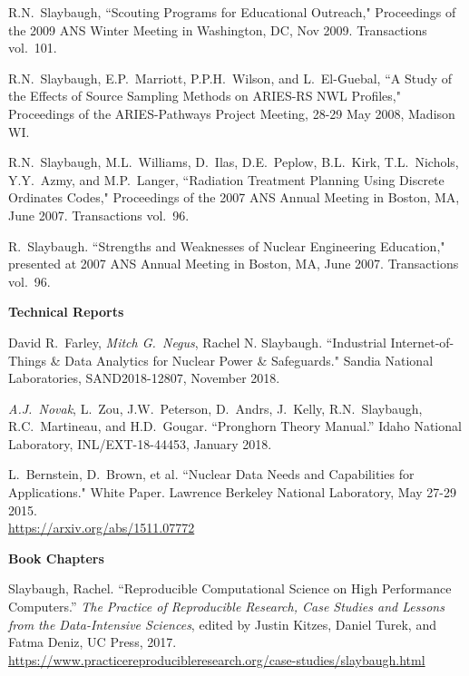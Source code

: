 \begin{bibsection}
\item R.N.\ Slaybaugh, ``Scouting Programs for Educational Outreach," Proceedings of the 2009 ANS Winter Meeting in Washington, DC, Nov 2009. Transactions vol.\ 101.

\item R.N.\ Slaybaugh, E.P.\ Marriott, P.P.H.\ Wilson, and L.\ El-Guebal, ``A Study of the Effects of Source Sampling Methods on ARIES-RS NWL Profiles," Proceedings of the ARIES-Pathways Project Meeting, 28-29 May 2008, Madison WI. 

\item R.N.\ Slaybaugh, M.L.\ Williams, D.\ Ilas, D.E.\ Peplow, B.L.\ Kirk, T.L.\ Nichols, Y.Y.\ Azmy, and M.P.\ Langer, ``Radiation Treatment Planning Using Discrete Ordinates Codes," Proceedings of the 2007 ANS Annual Meeting in Boston, MA, June 2007. Transactions vol.\ 96.

\item R.\ Slaybaugh. ``Strengths and Weaknesses of Nuclear Engineering Education," presented at 2007 ANS Annual Meeting in Boston, MA, June 2007. Transactions vol.\ 96.

\item \textbf{Technical Reports}
\item David R.\ Farley, \textit{Mitch G.\ Negus}, Rachel N.
 Slaybaugh. ``Industrial Internet-of-Things \& Data Analytics for Nuclear Power \& Safeguards." Sandia National Laboratories, SAND2018-12807, November 2018.

\item	\textit{A.J.\ Novak}, L.\ Zou, J.W.\ Peterson, D.\ Andrs, J.\ Kelly, R.N.\ Slaybaugh, R.C.\ Martineau, and H.D.\ Gougar. “Pronghorn Theory Manual.” Idaho National Laboratory, INL/EXT-18-44453, January 2018.

\item L.\ Bernstein, D.\ Brown, et al. ``Nuclear Data Needs and Capabilities for Applications." White Paper. Lawrence Berkeley National Laboratory, May 27-29 2015. \\
\url{https://arxiv.org/abs/1511.07772}


\item \textbf{Book Chapters}
\item Slaybaugh, Rachel. ``Reproducible Computational Science on High Performance Computers.'' \textit{The Practice of Reproducible Research, Case Studies and Lessons from the Data-Intensive Sciences}, edited by Justin Kitzes, Daniel Turek, and Fatma Deniz, UC Press, 2017. \\ \url{https://www.practicereproducibleresearch.org/case-studies/slaybaugh.html}



\end{bibsection}
